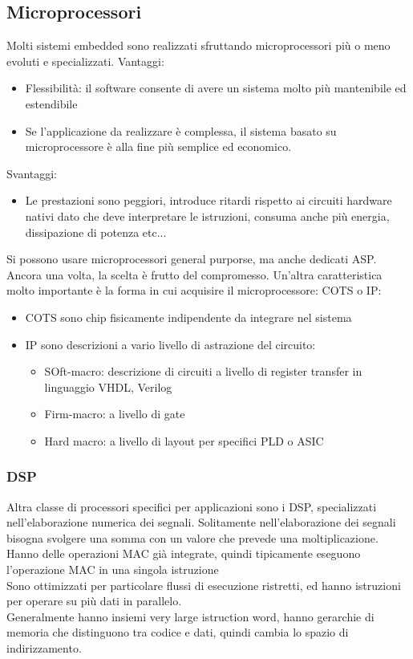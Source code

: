 \documentclass[12pt, oneside]{extbook}
\begin{document}
\subsection{Microprocessori}
Molti sistemi embedded sono realizzati sfruttando microprocessori più o meno evoluti e specializzati. Vantaggi:
\begin{itemize}
\item Flessibilità: il software consente di avere un sistema molto più mantenibile ed estendibile
\item Se l'applicazione da realizzare è complessa, il sistema basato su microprocessore è alla fine più semplice ed economico.
\end{itemize}
Svantaggi:
\begin{itemize}
\item Le prestazioni sono peggiori, introduce ritardi rispetto ai circuiti hardware nativi dato che deve interpretare le istruzioni, consuma anche più energia, dissipazione di potenza etc...
\end{itemize}
Si possono usare microprocessori general purporse, ma anche dedicati ASP. Ancora una volta, la scelta è frutto del compromesso. Un'altra caratteristica molto importante è la forma in cui acquisire il microprocessore: COTS o IP:
\begin{itemize}
\item COTS sono chip fisicamente indipendente da integrare nel sistema
\item IP sono descrizioni a vario livello di astrazione del circuito:
\begin{itemize}
\item SOft-macro: descrizione di circuiti a livello di register transfer in linguaggio VHDL, Verilog
\item Firm-macro: a livello di gate 
\item Hard macro: a livello di layout per specifici PLD o ASIC
\end{itemize}
\end{itemize}
\subsubsection{DSP}
Altra classe di processori specifici per applicazioni sono i DSP, specializzati nell'elaborazione numerica dei segnali. Solitamente nell'elaborazione dei segnali bisogna svolgere una somma con un valore che prevede una moltiplicazione. Hanno delle operazioni MAC già integrate, quindi tipicamente eseguono l'operazione MAC in una singola istruzione\\ Sono ottimizzati per particolare flussi di esecuzione ristretti, ed hanno istruzioni per operare su più dati in parallelo.\\ Generalmente hanno insiemi very large istruction word, hanno gerarchie di memoria che distinguono tra codice e dati, quindi cambia lo spazio di indirizzamento.
\end{document}
